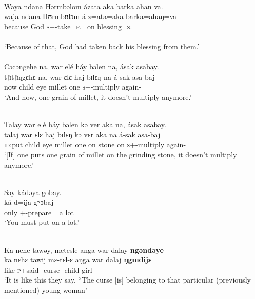 \medskip
{}\\
Waya  ndana  Hərmbəlom  ázata  aka  barka  ahan  va.\\
\gll waja     ndana   Hʊrmbʊlɔm   á-z=ata=aka  barka=ahaŋ=va\\
      because  {\DEM}   God      \textsc{s}+{\IFV}-take=\textsc{p}.{\IO}=on   blessing=\textsc{s}.{\POSS}={\PRF}\\  
\\
\glt ‘Because of that, God had taken back his blessing from them.’\\

\medskip
{}\\
     Cəcəngehe  na,  war  elé  háy  bəlen  na,  ásak  asabay.\\
\gll tʃɪtʃɪŋgɛhɛ  na,  war  ɛlɛ        haj  bɪlɛŋ     na      á-sak                                        asa-baj\\
      now       {\PSP}  child   eye   millet   one   {\PSP}  \textsc{s}+{\IFV}-multiply    again-{\NEG}\\
\glt ‘And now, one grain of millet, it doesn’t multiply anymore.’

\medskip
{}\\
        Talay war elé  háy bəlen kə ver aka na, ásak asabay.\\
\gll    talaj          war     ɛlɛ    haj      bɪlɛŋ  kə     vɛr     aka  na        á-sak                                      asa-baj\\
       \textsc{id}:put  child   eye   millet    one    on    stone    on    {\PSP}  \textsc{s}+{\IFV}-multiply  again-{\NEG}\\
\glt ‘[If] one puts one grain of millet on the grinding stone, it doesn’t multiply anymore.’

\medskip
 \\
 {Səy  kádəya  gobay.}\\
 ká-d=ija  gʷɔbaj\\
only    {\twoS}+{\IFV}-prepare={\PLU}   {a lot}\\
\glt ‘You must put on a lot.’

\medskip
{}\\
Ka  nehe  tawəy,  metesle  anga  war  dalay \textbf{ngəndəye}\\
\gll ka  nɛhɛ  tawij  mɛ-tɛɬ-ɛ      aŋga  war    dalaj  \textbf{ŋgɪndijɛ}\\
like  {\DEM}   \textsc{p}+said  {\NOM}{}-curse-{\CL}   {\POSS}   child  girl       {\DEM}      \\
\glt ‘It is like this they say, “The curse [is] belonging to that particular (previously mentioned) young woman’\\

